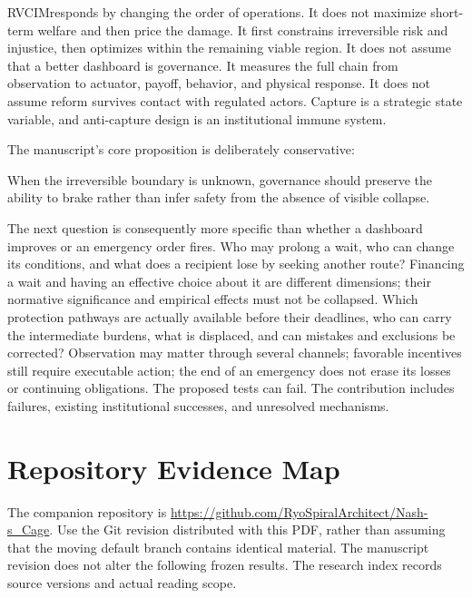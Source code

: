 \documentclass[11pt,a4paper]{article}
\numberwithin{equation}{section}
\theoremstyle{definition}
\theoremstyle{plain}
\theoremstyle{remark}
\newcommand{\RVCIM}{\textsc{RVCIM}}
\begin{document}
\RVCIM responds by changing the order of operations. It does not maximize short-term welfare and then price the damage. It first constrains irreversible risk and injustice, then optimizes within the remaining viable region. It does not assume that a better dashboard is governance. It measures the full chain from observation to actuator, payoff, behavior, and physical response. It does not assume reform survives contact with regulated actors. Capture is a strategic state variable, and anti-capture design is an institutional immune system.

The manuscript's core proposition is deliberately conservative:
\begin{corebox}
When the irreversible boundary is unknown, governance should preserve the ability to brake rather than infer safety from the absence of visible collapse.
\end{corebox}

The next question is consequently more specific than whether a dashboard improves or an emergency order fires. Who may prolong a wait, who can change its conditions, and what does a recipient lose by seeking another route? Financing a wait and having an effective choice about it are different dimensions; their normative significance and empirical effects must not be collapsed. Which protection pathways are actually available before their deadlines, who can carry the intermediate burdens, what is displaced, and can mistakes and exclusions be corrected? Observation may matter through several channels; favorable incentives still require executable action; the end of an emergency does not erase its losses or continuing obligations. The proposed tests can fail. The contribution includes failures, existing institutional successes, and unresolved mechanisms.

\appendix
\section{Repository Evidence Map}
\label{app:evidence}

The companion repository is \url{https://github.com/RyoSpiralArchitect/Nash-s_Cage}.
Use the Git revision distributed with this PDF, rather than assuming that the moving default branch contains identical material. The manuscript revision does not alter the following frozen results. The research index records source versions and actual reading scope.
\end{document}
